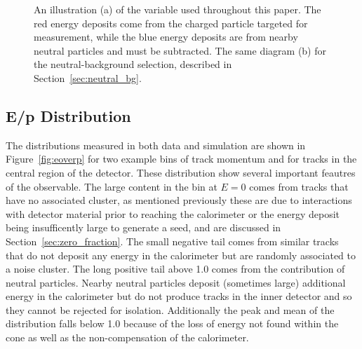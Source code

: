 \begin{figure}[htbp]
\centering
{}
\caption{An illustration (a) of the \ep variable used throughout this paper. The red energy deposits come from the charged particle targeted for measurement, while the blue energy deposits are from nearby neutral particles and must be subtracted. The same diagram (b) for the neutral-background selection, described in Section~\ref{sec:neutral_bg}.}
\label{fig:eoverp_cartoon}
\end{figure}

\subsection{E/p Distribution}

The \ep distributions measured in both data and simulation are shown in Figure~\ref{fig:eoverp} for two example bins of track momentum and for tracks in the central region of the detector. 
These distribution show several important feautres of the \ep observable.
The large content in the bin at $E=0$ comes from tracks that have no associated cluster, as mentioned previously these are due to interactions with detector material prior to reaching the calorimeter or the energy deposit being insufficently large to generate a seed, and are discussed in Section~\ref{sec:zero_fraction}.
The small negative tail comes from similar tracks that do not deposit any energy in the calorimeter but are randomly associated to a noise cluster.
The long positive tail above 1.0 comes from the contribution of neutral particles.
Nearby neutral particles deposit (sometimes large) additional energy in the calorimeter but do not produce tracks in the inner detector and so they cannot be rejected for isolation.
Additionally the peak and mean of the distribution falls below 1.0 because of the loss of energy not found within the cone as well as the non-compensation of the calorimeter.

